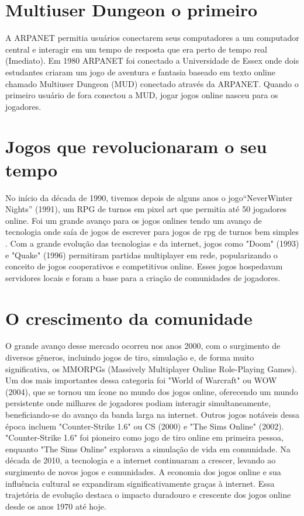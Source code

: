 \documentclass[conference]{ModeloA}
\begin{document}
\section{Multiuser Dungeon o primeiro}
A ARPANET permitia usuários conectarem seus computadores a um computador central e interagir em um tempo de resposta que era perto de tempo real (Imediato). Em 1980 ARPANET foi conectado a Universidade de Essex onde dois estudantes criaram um jogo de aventura e fantasia baseado em texto online chamado Multiuser Dungeon (MUD) conectado através da ARPANET. Quando o primeiro usuário de fora conectou a MUD, jogar jogos online nasceu para os jogadores.
\cite{Britannica}
\section{Jogos que revolucionaram o seu tempo}
No início da década de 1990, tivemos depois de alguns anos o jogo“NeverWinter Nights” (1991), um RPG de turnos em pixel art que permitia até 50 jogadores online. Foi um grande avanço para os jogos onlines tendo um avanço de tecnologia onde saía de jogos de escrever para jogos de rpg de turnos bem simples  . Com a grande evolução das tecnologias e da internet, jogos como "Doom" (1993) e "Quake" (1996) permitiram partidas multiplayer em rede, popularizando o conceito de jogos cooperativos e competitivos online. Esses jogos hospedavam servidores locais e foram a base para a criação de comunidades de jogadores.
\cite{WikipediaNWN}
\section{O crescimento da comunidade}
O grande avanço desse mercado ocorreu nos anos 2000, com o surgimento de diversos gêneros, incluindo jogos de tiro, simulação e, de forma muito significativa, os MMORPGs (Massively Multiplayer Online Role-Playing Games). Um dos mais importantes dessa categoria foi "World of Warcraft" ou WOW (2004), que se tornou um ícone no mundo dos jogos online, oferecendo um mundo persistente onde milhares de jogadores podiam interagir simultaneamente, beneficiando-se do avanço da banda larga na internet. Outros jogos notáveis dessa época incluem "Counter-Strike 1.6" ou CS (2000) e "The Sims Online" (2002). "Counter-Strike 1.6" foi pioneiro como jogo de tiro online em primeira pessoa, enquanto "The Sims Online" explorava a simulação de vida em comunidade. Na década de 2010, a tecnologia e a internet continuaram a crescer, levando ao surgimento de novos jogos e comunidades. A economia dos jogos online e sua influência cultural se expandiram significativamente graças à internet. Essa trajetória de evolução destaca o impacto duradouro e crescente dos jogos online desde os anos 1970 até hoje.
\cite{WikipediaNWN}
\end{document}

